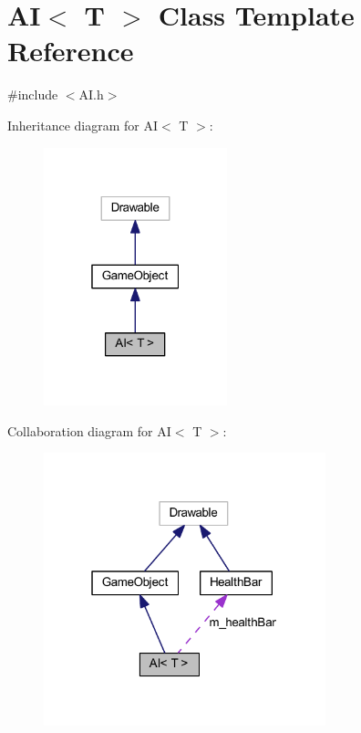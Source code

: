 \hypertarget{class_a_i}{}\section{AI$<$ T $>$ Class Template Reference}
\label{class_a_i}


{\ttfamily \#include $<$A\+I.\+h$>$}



Inheritance diagram for AI$<$ T $>$\+:\nopagebreak
\begin{figure}[H]
\begin{center}
\leavevmode
\includegraphics[width=151pt]{class_a_i__inherit__graph}
\end{center}
\end{figure}


Collaboration diagram for AI$<$ T $>$\+:\nopagebreak
\begin{figure}[H]
\begin{center}
\leavevmode
\includegraphics[width=232pt]{class_a_i__coll__graph}
\end{center}
\end{figure}
